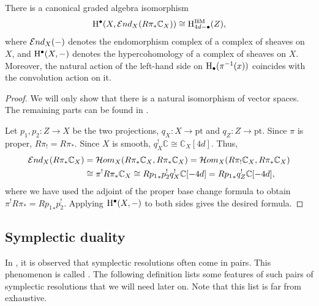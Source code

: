 \begin{proposition}[prop:]{}
    There is a canonical graded algebra isomorphism
    \begin{equation*}
        \mathrm{H}^\bullet(X, \mathcal{E}\mathnormal{nd}_X(R\pi_*\mathbb{C}_X)) \cong \mathrm{H}^\mathrm{BM}_{4d-\bullet}(Z),
    \end{equation*}
    where $\mathcal{E}\mathnormal{nd}_X(-)$ denotes the endomorphism complex of a complex of sheaves on $X$, and $\mathrm{H}^\bullet(X, -)$ denotes the hypercohomology of a complex of sheaves on $X$. Moreover, the natural action of the left-hand side on $\mathrm{H}_\bullet(\pi^{-1}(x))$ coincides with the convolution action on it.
    \begin{proof}
        We will only show that there is a natural isomorphism of vector spaces. The remaining parts can be found in \cite[Section 8.5]{chriss1997representation}.
    
        Let $p_1, p_2 : Z \to X$ be the two projections, $q_X : X \to \mathrm{pt}$ and $q_Z : Z \to \mathrm{pt}$. Since $\pi$ is proper, $R\pi_! = R\pi_*$. Since $X$ is smooth, $q_X^!\mathbb{C} \cong \mathbb{C}_X[4d]$. Thus,
        \begin{align*}
            \mathcal{E}\mathnormal{nd}_X(R\pi_*\mathbb{C}_X) &= \mathcal{H}\mathnormal{om}_X(R\pi_*\mathbb{C}_X, R\pi_*\mathbb{C}_X) = \mathcal{H}\mathnormal{om}_X(R\pi_!\mathbb{C}_X, R\pi_*\mathbb{C}_X) \\
            &\cong \pi^!R\pi_*\mathbb{C}_X \cong R{p_1}_*p_2^!q_X^!\mathbb{C}[-4d] = R{p_1}_*q_Z^!\mathbb{C}[-4d],
        \end{align*}
        where we have used the adjoint of the proper base change formula to obtain $\pi^!R\pi_* = R{p_1}_*p_2^!$. Applying $\mathrm{H}^\bullet(X, -)$ to both sides gives the desired formula.
    \end{proof}
\end{proposition}
\fi
\subsection{Symplectic duality}

In \cite{braden2016quantizationsconicalsymplecticresolutions}, it is observed that symplectic resolutions often come in pairs. This phenomenon is called . The following definition lists some features of such pairs of symplectic resolutions that we will need later on. Note that this list is far from exhaustive.

